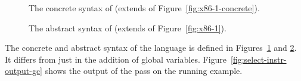 \documentclass[7x10]{TimesAPriori_MIT}%
\newcommand{\gray}[1]{{\color{gray} #1}}
\begin{document}
\begin{figure}[tp]
\fbox{
\begin{minipage}{0.96\textwidth}
\[
\begin{array}{lcl}
  \Arg &::=& \gray{ \key{\$}\Int \MID \key{\%}\Reg \MID \Int\key{(}\key{\%}\Reg\key{)} \MID \key{\%}\itm{bytereg} } \MID \Var \key{(\%rip)} \\
\LangXGlobalM{} &::= & \gray{ \key{.globl main} }\\
      &    & \gray{ \key{main:} \; \Instr\ldots }
\end{array}
\]
\end{minipage}
}
\caption{The concrete syntax of \LangXGlobal{}  (extends \LangXIf{} of Figure~\ref{fig:x86-1-concrete}).}
\label{fig:x86-2-concrete}
\end{figure}

\begin{figure}[tp]
\fbox{
  \begin{minipage}{0.96\textwidth}
    \small
\[
\begin{array}{lcl}
  \Arg &::=&  \gray{  \INT{\Int} \MID \REG{\Reg} \MID \DEREF{\Reg}{\Int}
   \MID \BYTEREG{\Reg}} \\
   &\MID& \GLOBAL{\Var} \\
\LangXGlobalM{} &::= & \gray{ \XPROGRAM{\itm{info}}{\LP\LP\itm{label} \,\key{.}\, \Block \RP\ldots\RP} }
\end{array}
\]
\end{minipage}
}
\caption{The abstract syntax of \LangXGlobal{} (extends \LangXIf{} of Figure~\ref{fig:x86-1}).}
\label{fig:x86-2}
\end{figure}

The concrete and abstract syntax of the \LangXGlobal{} language is
defined in Figures~\ref{fig:x86-2-concrete} and \ref{fig:x86-2}.  It
differs from \LangXIf{} just in the addition of global variables.
%
Figure~\ref{fig:select-instr-output-gc} shows the output of the
 pass on the running example.
\end{document}
